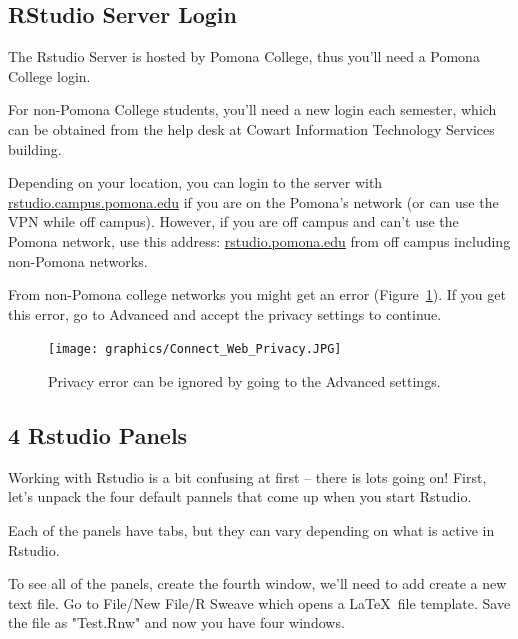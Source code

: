 \documentclass[12pt]{../SOP4_alpha}\usepackage[]{graphicx}\usepackage[]{color}
\begin{document}
\subsection{RStudio Server Login}

\NP The Rstudio Server is hosted by Pomona College, thus you'll need a Pomona College login. 

\NP For non-Pomona College students, you'll need a new login each semester, which can be obtained from the help desk at Cowart Information Technology Services building.

\NP Depending on your location, you can login to the server with \url{rstudio.campus.pomona.edu} if you are on the Pomona's network (or can use the VPN while off campus). However, if you are off campus and can't use the Pomona network, use this address: \url{rstudio.pomona.edu} from off campus including non-Pomona networks.

\NP From non-Pomona college networks you might get an error (Figure~\ref{fig:privacyerror}). If you get this error, go to Advanced and accept the privacy settings to continue.

\begin{figure}[t]
\centering
\texttt{[image: graphics/Connect\_Web\_Privacy.JPG]}
\caption{Privacy error can be ignored by going to the Advanced settings.}
\label{fig:privacyerror}
\end{figure}


\subsection{4 Rstudio Panels}

Working with Rstudio is a bit confusing at first -- there is lots going on! First, let's unpack the four default pannels that come up when you start Rstudio. 

\NP Each of the panels have tabs, but they can vary depending on what is active in Rstudio. 

\NP To see all of the panels, create the fourth window, we'll need to add create a new text file. Go to File/New File/R Sweave which opens a \LaTeX\ file template. Save the file as "Test.Rnw" and now you have four windows.
\end{document}
